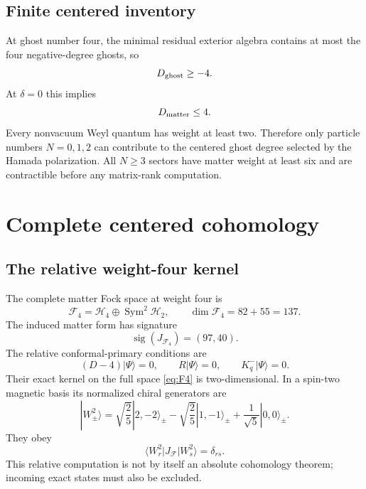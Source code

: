 \documentclass[11pt]{article}
\theoremstyle{definition}
\theoremstyle{remark}
\newcommand{\F}{\mathcal F}
\newcommand{\cH}{\mathcal H}
\begin{document}
\subsection{Finite centered inventory}

At ghost number four, the minimal residual exterior algebra contains at
most the four negative-degree ghosts, so
\begin{equation}
 D_{\rm ghost}\ge-4.
\end{equation}
At $\delta=0$ this implies
\begin{equation}\label{eq:matter-bound}
 D_{\rm matter}\le4.
\end{equation}
Every nonvacuum Weyl quantum has weight at least two.  Therefore only
particle numbers $N=0,1,2$ can contribute to the centered ghost degree
selected by the Hamada polarization.  All $N\ge3$ sectors have matter weight at least six and are
contractible before any matrix-rank computation.

\section{Complete centered cohomology}\label{sec:centered}

\subsection{The relative weight-four kernel}

The complete matter Fock space at weight four is
\begin{equation}\label{eq:F4}
 \F_4=\cH_4\oplus\operatorname{Sym}^2\cH_2,
 \qquad \dim\F_4=82+55=137.
\end{equation}
The induced matter form has signature
\begin{equation}\label{eq:F4-signature}
 \operatorname{sig}(J_{\F_4})=(97,40).
\end{equation}
The relative conformal-primary conditions are
\begin{equation}\label{eq:relative-conditions}
 (D-4)|\Psi\rangle=0,
 \qquad R|\Psi\rangle=0,
 \qquad K^-_q|\Psi\rangle=0.
\end{equation}
Their exact kernel on the full space \eqref{eq:F4} is two-dimensional.  In a
spin-two magnetic basis its normalized chiral generators are
\begin{equation}\label{eq:W-square-states}
 |W_\pm^2\rangle
 =\sqrt{\frac25}|2,-2\rangle_\pm
 -\sqrt{\frac25}|1,-1\rangle_\pm
 +\frac1{\sqrt5}|0,0\rangle_\pm.
\end{equation}
They obey
\begin{equation}\label{eq:relative-I2}
 \langle W_r^2|J_{\F}|W_s^2\rangle=\delta_{rs}.
\end{equation}
This relative computation is not by itself an absolute cohomology theorem;
incoming exact states must also be excluded.
\end{document}
